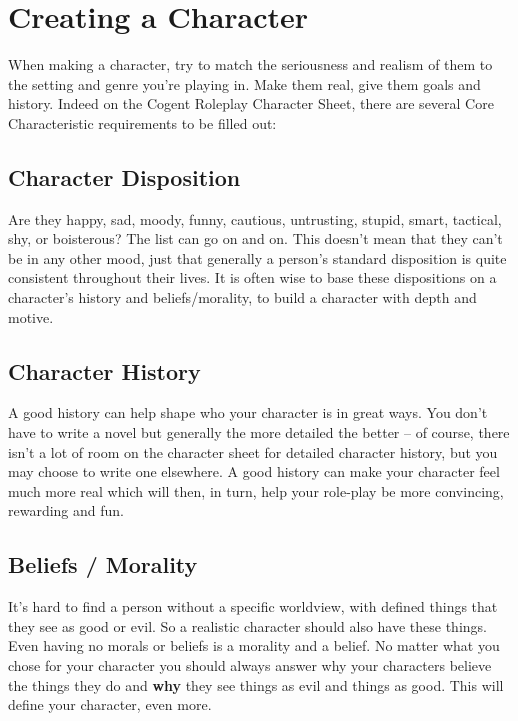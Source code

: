 \section{Creating a Character} \label{sec:creating_a_character}

When making a character, try to match the seriousness and realism of them to the setting and genre you’re playing in. Make them real, give them goals and history. Indeed on the Cogent Roleplay Character Sheet, there are several Core Characteristic requirements to be filled out:


\subsection{Character Disposition} \label{sec:character_disposition}

Are they happy, sad, moody, funny, cautious, untrusting, stupid, smart, tactical, shy, or boisterous? The list can go on and on. This doesn’t mean that they can’t be in any other mood, just that generally a person’s standard disposition is quite consistent throughout their lives. It is often wise to base these dispositions on a character’s history and beliefs/morality, to build a character with depth and motive.

\subsection{Character History} \label{sec:character_history}

A good history can help shape who your character is in great ways. You don’t have to write a novel but generally the more detailed the better – of course, there isn’t a lot of room on the character sheet for detailed character history, but you may choose to write one elsewhere. A good history can make your character feel much more real which will then, in turn, help your role-play be more convincing, rewarding and fun.

\subsection{Beliefs / Morality} \label{sec:beliefs_morality}

It’s hard to find a person without a specific worldview, with defined things that they see as good or evil. So a realistic character should also have these things. Even having no morals or beliefs is a morality and a belief. No matter what you chose for your character you should always answer why your characters believe the things they do and \textbf{why} they see things as evil and things as good. This will define your character, even more.

